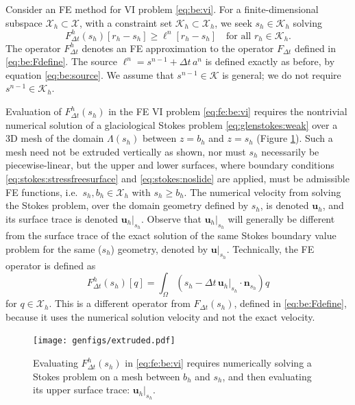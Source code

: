 \documentclass[hidelinks,onefignum,onetabnum,final]{siamart220329}  %
\newcommand{\bn}{\mathbf{n}}
\newcommand{\bu}{\mathbf{u}}
\newcommand{\cK}{\mathcal{K}}
\newcommand{\cX}{\mathcal{X}}
\begin{document}
Consider an FE method for VI problem \eqref{eq:be:vi}.  For a finite-dimensional subspace $\cX_h\subset \cX$, with a constraint set $\cK_h\subset \cX_h$, we seek $s_h\in\cK_h$ solving
\begin{equation}
F^h_{\Delta t}(s_h)[r_h-s_h] \ge \ell^n[r_h-s_h] \quad \text{for all } r_h \in \cK_h. \label{eq:fe:be:vi}
\end{equation}
The operator $F^h_{\Delta t}$ denotes an FE approximation to the operator $F_{\Delta t}$ defined in \eqref{eq:be:Fdefine}.  The source $\ell^n = s^{n-1} + \Delta t\,a^n$ is defined exactly as before, by equation \eqref{eq:be:source}.  We assume that $s^{n-1} \in \cK$ is general; we do not require $s^{n-1}\in\cK_h$.

Evaluation of $F^h_{\Delta t}(s_h)$ in the FE VI problem \eqref{eq:fe:be:vi} requires the nontrivial numerical solution of a glaciological Stokes problem \eqref{eq:glenstokes:weak} over a 3D mesh of the domain $\Lambda(s_h)$ between $z=b_h$ and $z=s_h$ (Figure \ref{fig:fe:operatorvisualization}).  Such a mesh need not be extruded vertically as shown, nor must $s_h$ necessarily be piecewise-linear, but the upper and lower surfaces, where boundary conditions \eqref{eq:stokes:stressfreesurface} and \eqref{eq:stokes:noslide} are applied, must be admissible FE functions, i.e.~$s_h,b_h\in\cX_h$ with $s_h\ge b_h$.  The numerical velocity from solving the Stokes problem, over the domain geometry defined by $s_h$, is denoted $\bu_h$, and its surface trace is denoted $\bu_h|_{s_h}$.  Observe that $\bu_h|_{s_h}$ will generally be different from the surface trace of the exact solution of the same Stokes boundary value problem for the same ($s_h$) geometry, denoted by $\bu|_{s_h}$.  Technically, the FE operator is defined as
\begin{equation}
F_{\Delta t}^h(s_h)[q] = \int_\Omega \left(s_h - \Delta t\, \bu_h|_{s_h}\cdot \bn_{s_h}\right) q
\label{eq:fe:be:Fdefine}
\end{equation}
for $q\in\cX_h$.  This is a different operator from $F_{\Delta t}(s_h)$, defined in \eqref{eq:be:Fdefine}, because it uses the numerical solution velocity and not the exact velocity.

\begin{figure}[ht]
\begin{center}
\texttt{[image: genfigs/extruded.pdf]}
\end{center}
\caption{Evaluating $F^h_{\Delta t}(s_h)$ in \eqref{eq:fe:be:vi} requires numerically solving a Stokes problem on a mesh between $b_h$ and $s_h$, and then evaluating its upper surface trace: $\bu_h|_{s_h}$.}
\label{fig:fe:operatorvisualization}
\end{figure}
\end{document}
